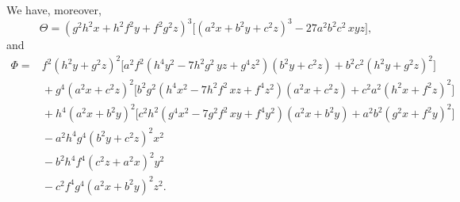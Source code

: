 \documentclass[11pt,a4paper]{article}
\begin{document}
We have, moreover,
\[
\Theta = (g^2 h^2 x + h^2 f^2 y + f^2 g^2 z)^3
 \bigl[ (a^2 x + b^2 y + c^2 z)^3 - 27 a^2 b^2 c^2 \, xyz \bigr],
\]
and
\[
\begin{aligned}
\Phi = {}& f^2 (h^2 y + g^2 z)^2 \bigl[ a^2 f^2 (h^4 y^2 - 7 h^2 g^2 \, yz + g^4 z^2)(b^2 y + c^2 z) + b^2 c^2 (h^2 y + g^2 z)^2 \bigr] \\
& {} + g^4 (a^2 x + c^2 z)^2 \bigl[ b^2 g^2 (h^4 x^2 - 7 h^2 f^2 \, xz + f^4 z^2)(a^2 x + c^2 z) + c^2 a^2 (h^2 x + f^2 z)^2 \bigr] \\
& {} + h^4 (a^2 x + b^2 y)^2 \bigl[ c^2 h^2 (g^4 x^2 - 7 g^2 f^2 \, xy + f^4 y^2)(a^2 x + b^2 y) + a^2 b^2 (g^2 x + f^2 y)^2 \bigr] \\
& {} - a^2 h^4 g^4 (b^2 y + c^2 z)^2 x^2 \\
& {} - b^2 h^4 f^4 (c^2 z + a^2 x)^2 y^2 \\
& {} - c^2 f^4 g^4 (a^2 x + b^2 y)^2 z^2.
\end{aligned}
\]
\end{document}
